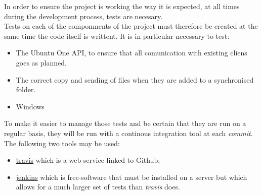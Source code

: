In order to ensure the project is working the way it is expected, at all times during the development process, tests are necesary.\\

Tests on each of the compomnents of the project must therefore be created at the same time the code itself is writtent. It is in particular necessary to test:\\

\begin{itemize}
\renewcommand{\labelitemi}{$\bullet$}
\item The Ubuntu One API, to ensure that all comunication with existing cliens goes as planned.
\item The correct copy and sending of files when they are added to a synchronised folder.
\item Windows
\end{itemize}

\vspace{0.5cm}

To make it easier to manage those tests and be certain that they are run on a regular basis, they will be run with a continous integration tool at each \textit{commit}. The following two tools may be used:\\

\begin{itemize}
\renewcommand{\labelitemi}{$\bullet$}
\item \href{https://travis-ci.org}{travis} which is a web-service linked to Github;
\item \href{http://jenkins-ci.org}{jenkins} which is free-software that must be installed on a server but which allows for a much larger set of tests than \textit{travis} does.
\end{itemize}

